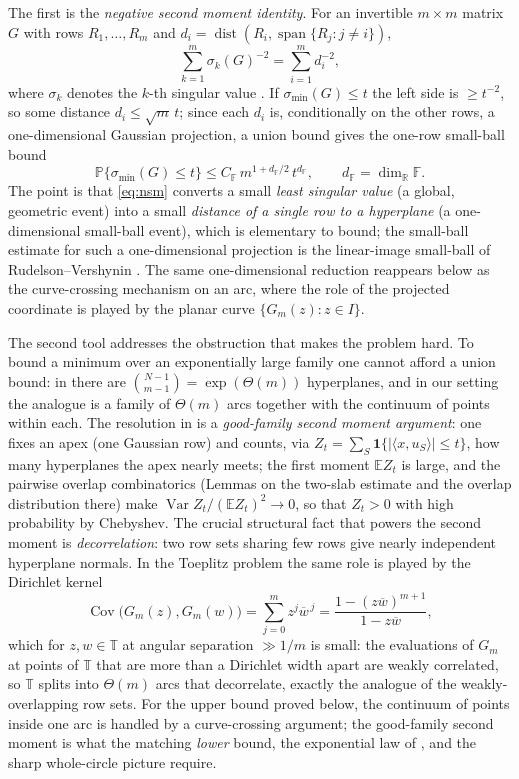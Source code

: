 \documentclass[11pt]{amsart}
\numberwithin{equation}{section}
\theoremstyle{definition}
\theoremstyle{remark}
\newcommand{\R}{\mathbb R}
\newcommand{\F}{\mathbb F}
\newcommand{\T}{\mathbb T}
\newcommand{\Prob}{\mathbb P}
\newcommand{\Exp}{\mathbb E}
\newcommand{\Var}{\operatorname{Var}}
\newcommand{\Cov}{\operatorname{Cov}}
\newcommand{\Span}{\operatorname{span}}
\newcommand{\dist}{\operatorname{dist}}
\newcommand{\smin}{\sigma_{\min}}
\begin{document}
The first is the \emph{negative second moment identity}. For an invertible $m\times m$ matrix $G$ with rows $R_1,\dots,R_m$ and $d_i=\dist(R_i,\Span\{R_j:j\ne i\})$,
\begin{equation}\label{eq:nsm}
  \sum_{k=1}^m\sigma_k(G)^{-2}=\sum_{i=1}^m d_i^{-2},
\end{equation}
where $\sigma_k$ denotes the $k$-th singular value \cite[Lem.~2.1]{PhaseRetrieval}. If $\smin(G)\le t$ the left side is $\ge t^{-2}$, so some distance $d_i\le\sqrt m\,t$; since each $d_i$ is, conditionally on the other rows, a one-dimensional Gaussian projection, a union bound gives the one-row small-ball bound
\begin{equation}\label{eq:onerow}
  \Prob\{\smin(G)\le t\}\le C_\F\,m^{1+d_\F/2}\,t^{d_\F},\qquad d_\F=\dim_\R\F.
\end{equation}
The point is that \eqref{eq:nsm} converts a small \emph{least singular value} (a global, geometric event) into a small \emph{distance of a single row to a hyperplane} (a one-dimensional small-ball event), which is elementary to bound; the small-ball estimate for such a one-dimensional projection is the linear-image small-ball of Rudelson--Vershynin \cite{RudelsonVershynin2015}. The same one-dimensional reduction reappears below as the curve-crossing mechanism on an arc, where the role of the projected coordinate is played by the planar curve $\{G_m(z):z\in I\}$.

The second tool addresses the obstruction that makes the problem hard. To bound a minimum over an exponentially large family one cannot afford a union bound: in \cite{PhaseRetrieval} there are $\binom{N-1}{m-1}=\exp(\Theta(m))$ hyperplanes, and in our setting the analogue is a family of $\Theta(m)$ arcs together with the continuum of points within each. The resolution in \cite{PhaseRetrieval} is a \emph{good-family second moment argument}: one fixes an apex (one Gaussian row) and counts, via $Z_t=\sum_S\mathbf1\{|\langle x,u_S\rangle|\le t\}$, how many hyperplanes the apex nearly meets; the first moment $\Exp Z_t$ is large, and the pairwise overlap combinatorics (Lemmas on the two-slab estimate and the overlap distribution there) make $\Var Z_t/(\Exp Z_t)^2\to0$, so that $Z_t>0$ with high probability by Chebyshev. The crucial structural fact that powers the second moment is \emph{decorrelation}: two row sets sharing few rows give nearly independent hyperplane normals. In the Toeplitz problem the same role is played by the Dirichlet kernel
\begin{equation}\label{eq:dirichlet}
  \Cov\bigl(G_m(z),G_m(w)\bigr)=\sum_{j=0}^m z^j\overline{w}^{\,j}=\frac{1-(z\overline w)^{m+1}}{1-z\overline w},
\end{equation}
which for $z,w\in\T$ at angular separation $\gg1/m$ is small: the evaluations of $G_m$ at points of $\T$ that are more than a Dirichlet width apart are weakly correlated, so $\T$ splits into $\Theta(m)$ arcs that decorrelate, exactly the analogue of the weakly-overlapping row sets. For the upper bound proved below, the continuum of points inside one arc is handled by a curve-crossing argument; the good-family second moment is what the matching \emph{lower} bound, the exponential law of \cite{YakirZeitouni,CookNguyen}, and the sharp whole-circle picture require.
\end{document}
